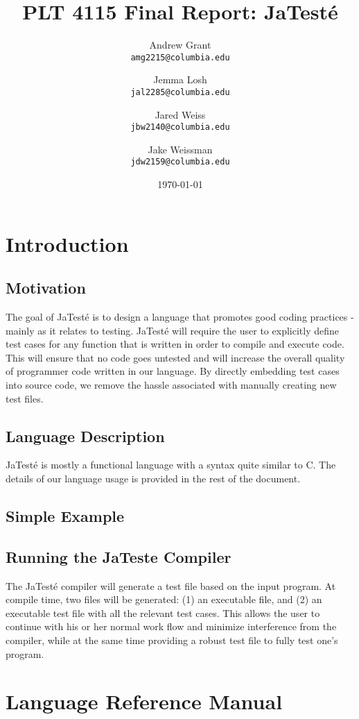 \documentclass{article}
\title{PLT 4115 Final Report: \textbf{JaTest\'{e}}}
\author{
	Andrew Grant\\
	\texttt{amg2215@columbia.edu}
	\and
	Jemma Losh\\
	\texttt{jal2285@columbia.edu}
	\and
	Jared Weiss\\
	\texttt{jbw2140@columbia.edu}
	\and
	Jake Weissman\\
	\texttt{jdw2159@columbia.edu}
}
\date{\today}
\begin{document}
\maketitle
\newpage

\tableofcontents
\newpage

\section{Introduction}

\subsection{Motivation}
The goal of JaTest\'{e} is to design a language that promotes good coding practices - mainly as it relates to testing.  JaTest\'{e} will require the user to explicitly define test cases for any function that is written in order to compile and execute code.  This will ensure that no code goes untested and will increase the overall quality of programmer code written in our language. By directly embedding test cases into source code, we remove the hassle associated with manually creating new test files. 

\subsection {Language Description}
JaTest\'{e} is mostly a functional language with a syntax quite similar to C.  The details of our language usage is provided in the rest of the document.

\subsection{Simple Example}

\subsection{Running the JaTeste Compiler}
The JaTest\'{e} compiler will generate a test file based on the input program. At compile time, two files will be generated: (1) an executable file, and (2) an executable test file with all the relevant test cases. This allows the user to continue with his or her normal work flow and minimize interference from the compiler, while at the same time providing a robust test file to fully test one's program. 

\section*{Language Reference Manual}
\end{document}
